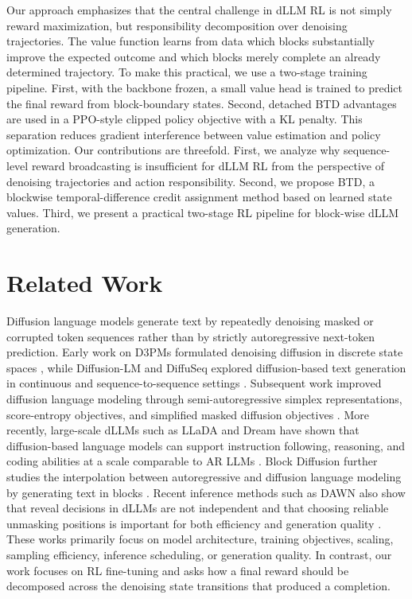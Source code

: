 \documentclass[letterpaper]{article}
\begin{document}
Our approach emphasizes that the central challenge in dLLM RL is not simply reward maximization, but responsibility decomposition over denoising trajectories. The value function learns from data which blocks substantially improve the expected outcome and which blocks merely complete an already determined trajectory. To make this practical, we use a two-stage training pipeline. First, with the backbone frozen, a small value head is trained to predict the final reward from block-boundary states. Second, detached BTD advantages are used in a PPO-style clipped policy objective with a KL penalty. This separation reduces gradient interference between value estimation and policy optimization. Our contributions are threefold. First, we analyze why sequence-level reward broadcasting is insufficient for dLLM RL from the perspective of denoising trajectories and action responsibility. Second, we propose BTD, a blockwise temporal-difference credit assignment method based on learned state values. Third, we present a practical two-stage RL pipeline for block-wise dLLM generation.

\section{Related Work}

Diffusion language models generate text by repeatedly denoising masked or corrupted token sequences rather than by strictly autoregressive next-token prediction. Early work on D3PMs formulated denoising diffusion in discrete state spaces \cite{austin2021structured}, while Diffusion-LM and DiffuSeq explored diffusion-based text generation in continuous and sequence-to-sequence settings \cite{li2022diffusionlm,gong2022diffuseq}. Subsequent work improved diffusion language modeling through semi-autoregressive simplex representations, score-entropy objectives, and simplified masked diffusion objectives \cite{han2022ssdlm,lou2023sedd,sahoo2024mdlm}. More recently, large-scale dLLMs such as LLaDA and Dream have shown that diffusion-based language models can support instruction following, reasoning, and coding abilities at a scale comparable to AR LLMs \cite{nie2025llada,ye2025dream}. Block Diffusion further studies the interpolation between autoregressive and diffusion language modeling by generating text in blocks \cite{arriola2025block}. Recent inference methods such as DAWN also show that reveal decisions in dLLMs are not independent and that choosing reliable unmasking positions is important for both efficiency and generation quality \cite{luo2026dawn}. These works primarily focus on model architecture, training objectives, scaling, sampling efficiency, inference scheduling, or generation quality. In contrast, our work focuses on RL fine-tuning and asks how a final reward should be decomposed across the denoising state transitions that produced a completion.
\end{document}
